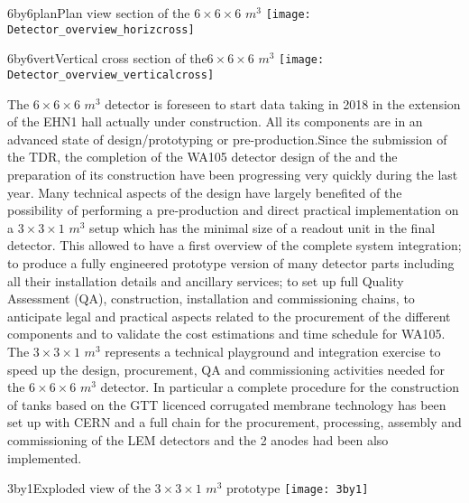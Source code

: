 \begin{cdrfigure}{6by6plan}{\small Plan view section of the $6\times 6\times 6$ $m^3$ }
\texttt{[image: Detector\_overview\_horizcross]}
\end{cdrfigure}

\begin{cdrfigure}{6by6vert}{\small Vertical cross section of the$6\times 6\times 6$ $m^3$}
\texttt{[image: Detector\_overview\_verticalcross]}
\end{cdrfigure}


The $6\times 6\times 6$ $m^3$  detector is foreseen to start data taking in 2018 in the extension of the EHN1 hall actually under construction. All its components are in an advanced state of design/prototyping or pre-production.Since the submission of the TDR, the completion of the WA105 detector design of the  and the preparation of its construction have been progressing very quickly during the last year. Many technical aspects of the design have largely benefited of the possibility of performing a pre-production and direct practical implementation on a  $3 \times 3 \times 1$ $m^3$  setup which has the minimal size of a readout unit in the final detector.  This allowed to have a first overview of the complete system integration; to produce a fully engineered prototype version of many detector parts including all their installation details and ancillary services; to set up full Quality Assessment (QA), construction, installation and commissioning chains, to anticipate legal and practical aspects related to the procurement of the different components and to validate the cost estimations and time schedule for WA105.  The  $3 \times 3 \times 1$ $m^3$   represents a technical playground and integration exercise to speed up the design, procurement, QA and commissioning activities needed for the  $6\times 6\times 6$ $m^3$ detector.  In particular a complete procedure for the construction of tanks based on the GTT licenced corrugated membrane technology has been set up with CERN and a full chain for the procurement, processing, assembly and commissioning of the LEM detectors and the 2 anodes had been also implemented.

\begin{cdrfigure}{3by1}{Exploded view of the  $3\times 3\times 1$  $m^3$  prototype}
\texttt{[image: 3by1]}
\end{cdrfigure}






